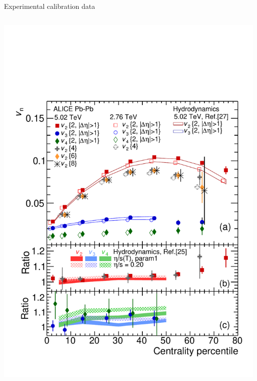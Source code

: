 \documentclass{beamer}
\begin{document}
\begin{frame}{Experimental calibration data}
\begin{columns}
    \includegraphics[height=.4\textheight]{flow}
  \end{columns}
\end{frame}
\end{document}

